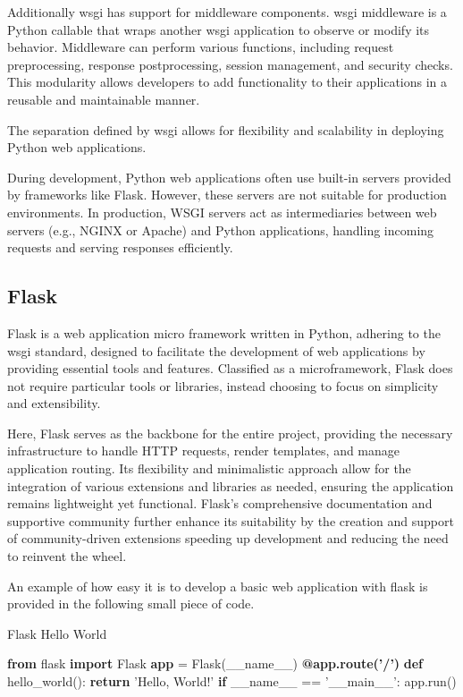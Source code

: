 Additionally \ac{wsgi} has support for middleware components. \ac{wsgi} middleware is a Python callable that wraps another 
\ac{wsgi} application to observe or modify its behavior. Middleware can perform various functions, including request 
preprocessing, response postprocessing, session management, and security checks. This modularity allows developers to 
add functionality to their applications in a reusable and maintainable manner.

The separation defined by \ac{wsgi} allows for flexibility and scalability in deploying Python web applications.

During development, Python web applications often use built-in servers provided by frameworks like Flask. 
However, these servers are not suitable for production environments. In production, WSGI servers act as intermediaries 
between web servers (e.g., NGINX or Apache) and Python applications, handling incoming requests and serving responses 
efficiently.

\subsection{Flask}
Flask is a web application micro framework written in Python, adhering to the \ac{wsgi} standard, designed to 
facilitate the development of web applications by providing essential tools and features. Classified as a microframework, 
Flask does not require particular tools or libraries, instead choosing to focus on simplicity and extensibility\cite{flask2025}.

Here, Flask serves as the backbone for the entire project, providing the necessary infrastructure to handle HTTP 
requests, render templates, and manage application routing. Its flexibility and minimalistic approach allow for the 
integration of various extensions and libraries as needed, ensuring the application remains lightweight yet functional. 
Flask's comprehensive documentation and supportive community further enhance its suitability by the creation and support
of community-driven extensions speeding up development and reducing the need to reinvent the wheel.

An example of how easy it is to develop a basic web application with flask is provided in the following small 
piece of code.

\begin{algorithm}
  \caption{Flask Hello World}\label{flask-hello-world}
  \begin{algorithmic}[1]
    \State \textbf{from} flask \textbf{import} Flask
    \State \textbf{app} = Flask(\_\_name\_\_)
    \State
    \State \textbf{@app.route('/')}
    \State \textbf{def} hello\_world():
    \State \hspace{1em} \textbf{return} 'Hello, World!'
    \State
    \State \textbf{if} \_\_name\_\_ == '\_\_main\_\_':
    \State \hspace{1em} app.run()
  \end{algorithmic}
\end{algorithm}


